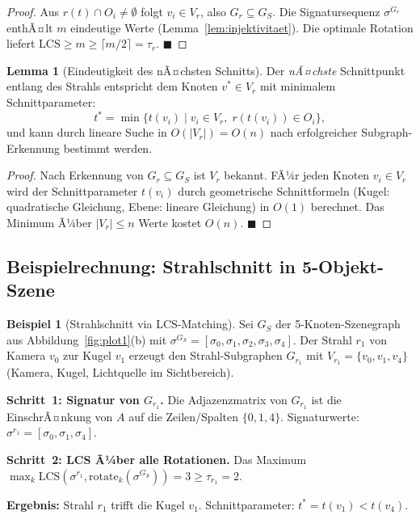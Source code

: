 ﻿\documentclass[a4paper,12pt]{article}
\theoremstyle{definition}
\newtheorem{beispiel}{Beispiel}[section]
\newtheorem{lemma}{Lemma}[section]
\begin{document}
\begin{proof}
  Aus $r(t) \cap O_i \neq \emptyset$ folgt $v_i \in V_r$, also
  $G_r \subseteq G_S$. Die Signatursequenz $\sigma^{G_r}$ enthÃ¤lt
  $m$ eindeutige Werte (Lemma~\ref{lem:injektivitaet}).
  Die optimale Rotation liefert $\mathrm{LCS} \geq m \geq
  \lceil m/2 \rceil = \tau_r$. \hfill$\blacksquare$
\end{proof}

\begin{lemma}[Eindeutigkeit des nÃ¤chsten Schnitts]
  \label{lem:naechster_schnitt}
  Der \emph{nÃ¤chste} Schnittpunkt entlang des Strahls entspricht
  dem Knoten $v^* \in V_r$ mit minimalem Schnittparameter:
  \[
    t^* = \min\bigl\{t(v_i) \;\big|\; v_i \in V_r,\;
    r(t(v_i)) \in O_i\bigr\},
  \]
  und kann durch lineare Suche in $O(|V_r|) = O(n)$ nach
  erfolgreicher Subgraph-Erkennung bestimmt werden.
\end{lemma}

\begin{proof}
  Nach Erkennung von $G_r \subseteq G_S$ ist $V_r$ bekannt.
  FÃ¼r jeden Knoten $v_i \in V_r$ wird der Schnittparameter
  $t(v_i)$ durch geometrische Schnittformeln (Kugel: quadratische
  Gleichung, Ebene: lineare Gleichung) in $O(1)$ berechnet.
  Das Minimum Ã¼ber $|V_r| \leq n$ Werte kostet $O(n)$.
  \hfill$\blacksquare$
\end{proof}

\subsection{Beispielrechnung: Strahlschnitt in 5-Objekt-Szene}

\begin{beispiel}[Strahlschnitt via LCS-Matching]
  \label{bsp:schnitt}
  Sei $G_S$ der 5-Knoten-Szenegraph aus
  Abbildung~\ref{fig:plot1}(b) mit
  $\sigma^{G_S} = [\sigma_0, \sigma_1, \sigma_2, \sigma_3,
  \sigma_4]$.
  Der Strahl $r_1$ von Kamera $v_0$ zur Kugel $v_1$ erzeugt
  den Strahl-Subgraphen $G_{r_1}$ mit
  $V_{r_1} = \{v_0, v_1, v_4\}$ (Kamera, Kugel, Lichtquelle
  im Sichtbereich).

  \textbf{Schritt~1: Signatur von $G_{r_1}$.}
  Die Adjazenzmatrix von $G_{r_1}$ ist die EinschrÃ¤nkung von $A$
  auf die Zeilen/Spalten $\{0,1,4\}$. Signaturwerte:
  $\sigma^{r_1} = [\sigma_0, \sigma_1, \sigma_4]$.

  \textbf{Schritt~2: LCS Ã¼ber alle Rotationen.}
  Das Maximum $\max_k \mathrm{LCS}(\sigma^{r_1},
  \mathrm{rotate}_k(\sigma^{G_S})) = 3 \geq \tau_{r_1} = 2$.

  \textbf{Ergebnis:} Strahl $r_1$ trifft die Kugel $v_1$.
  Schnittparameter: $t^* = t(v_1) < t(v_4)$.
\end{beispiel}
\end{document}
